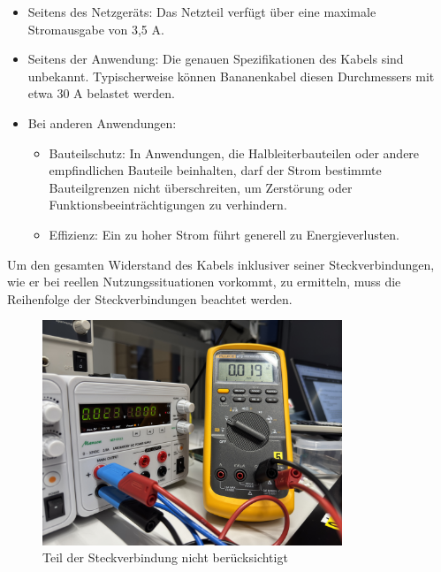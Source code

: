 \documentclass[a4paper,12pt]{article}
\begin{document}
\begin{itemize}
\item Seitens des Netzgeräts: Das Netzteil verfügt über eine maximale Stromausgabe von 3,5 A.
\item Seitens der Anwendung: Die genauen Spezifikationen des Kabels sind unbekannt. Typischerweise können Bananenkabel diesen Durchmessers mit etwa 30 A belastet werden. 
\item Bei anderen Anwendungen: 
	\begin{itemize}
	\item Bauteilschutz: In Anwendungen, die Halbleiterbauteilen oder andere empfindlichen Bauteile beinhalten, darf der Strom bestimmte Bauteilgrenzen nicht überschreiten, um Zerstörung oder Funktionsbeeinträchtigungen zu verhindern.
	\item Effizienz: Ein zu hoher Strom führt generell zu Energieverlusten.\\
	\end{itemize}
\end{itemize}
\noindent Um den gesamten Widerstand des Kabels inklusiver seiner Steckverbindungen, wie er bei reellen Nutzungssituationen vorkommt, zu ermitteln, muss die Reihenfolge der Steckverbindungen beachtet werden. 

\begin{figure}[H]
    \centering
    \includegraphics[width=0.8\textwidth]{../Quellen/Labor2/Fotos/IMG_3983.jpeg}
\caption{Teil der Steckverbindung nicht berücksichtigt}
\end{figure}
\end{document}
